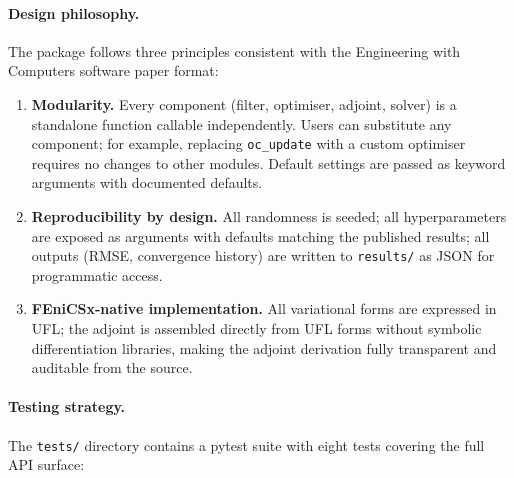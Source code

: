 \paragraph{Design philosophy.}
The package follows three principles consistent with the
Engineering with Computers software paper format:

\begin{enumerate}\itemsep2pt
    \item \textbf{Modularity.}
          Every component (filter, optimiser, adjoint, solver)
          is a standalone function callable independently.
          Users can substitute any component; for example, replacing
          \texttt{oc\_update} with a custom optimiser
          requires no changes to other modules.
          Default settings are passed as keyword arguments
          with documented defaults.

    \item \textbf{Reproducibility by design.}
          All randomness is seeded; all hyperparameters are
          exposed as arguments with defaults matching the
          published results; all outputs (RMSE,
          convergence history) are written to \texttt{results/}
          as JSON for programmatic access.

    \item \textbf{FEniCSx-native implementation.}
          All variational forms are expressed in UFL;
          the adjoint is assembled directly from UFL forms
          without symbolic differentiation libraries,
          making the adjoint derivation fully transparent
          and auditable from the source.
\end{enumerate}

\paragraph{Testing strategy.}
The \texttt{tests/} directory contains a pytest suite with
eight tests covering the full API surface:

